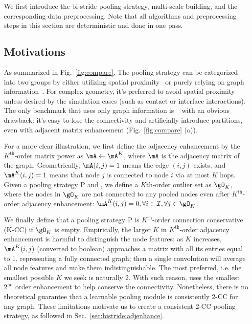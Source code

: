We first introduce the bi-stride pooling strategy, multi-scale building, and the corresponding data preprocessing. Note that all algorithms and preprocessing steps in this section are deterministic and done in one pass.
\subsection{Motivations}
As summarized in Fig.~\ref{fig:compare}. The pooling strategy can be categorized into two groups by either utilizing spatial proximity~\cite{lino2021simulating,lino2022towards} or purely relying on graph information~\cite{gao2019graph,li2020multipole}. For complex geometry, it's preferred to avoid spatial proximity unless desired by the simulation cases (such as contact or interface interactions). The only benchmark that uses only graph information is \GUN~\cite{gao2019graph} with an obvious drawback: it's easy to lose the connectivity and artificially introduce partitions, even with adjacent matrix enhancement (Fig.~\ref{fig:compare} (a)).

For a more clear illustration, we first define the adjacency enhancement by the $K^{\text{th}}$-order matrix power as $\mA\leftarrow\mA^K$, where $\mA$ is the adjacency matrix of the graph. Geometrically, $\mA(i,j)=1$ means the edge $(i,j)$ exists, and $\mA^K(i,j)=1$ means that node $j$ is connected to node $i$ via at most $K$ hops. Given a pooling strategy $\text{P}$ and , we define a $K{\text{th}}$-order outlier set as $\gO_K$, where the nodes in $\gO_K$ are not connected to any pooled nodes even after $K^{\text{th}}$-order adjacency enhancement: $\mA^K(i,j)=0,\forall i\in \revision{\mathcal{I}},\forall j\in\gO_K$.

We finally define that a pooling strategy $\text{P}$ is $K^{\text{th}}$-order connection conservative (K-CC) if $\gO_K$ is empty. Empirically, the larger $K$ in $K^{\text{th}}$-order adjacency enhancement is harmful to distinguish the node features: as $K$ increases, $\mA^K(i,j)$ (converted to boolean) approaches a matrix with all its entries equal to $1$, representing a fully connected graph; then a single convolution will average all node features and make them indistinguishable. The most preferred, i.e. the smallest possible $K$ we seek is naturally $2$.
With such reason, \citet{gao2019graph} uses the smallest $2^{\text{nd}}$ order enhancement to help conserve the connectivity. Nonetheless, there is no theoretical guarantee that a learnable pooling module is consistently 2-CC for any graph. These limitations motivate us to create a consistent 2-CC pooling strategy, as followed in Sec.~\ref{sec:bistride:adjenhance}.

